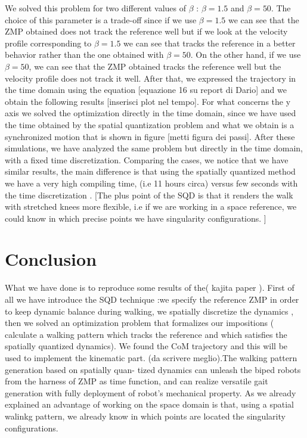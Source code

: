 \documentclass[a4paper]{article}
\begin{document}
We solved this problem for two different values of $\beta$ : $\beta=1.5$ and $\beta=50$. The choice of this parameter is a trade-off since if we use $\beta=1.5$ we can see that the ZMP obtained does not track the reference well but if we look at the velocity profile corresponding to $\beta=1.5$ we can see that tracks the reference in a better behavior rather than the one obtained with $\beta=50$. On the other hand, if we use $\beta=50$, we can see that the ZMP obtained tracks the reference well but the velocity profile does not track it well. 
After that, we expressed the trajectory in the time domain using the equation [equazione 16 su report di Dario] and we obtain the following results [inserisci plot nel tempo].
For what concerns the y axis we solved the optimization directly in the time domain, since we have used the time obtained by the spatial quantization problem and what we obtain is a synchronized motion that is shown in figure [metti figura dei passi].
After these simulations, we have analyzed the same problem but directly in the time domain, with a fixed time discretization. %
Comparing the cases, we notice that we have similar results, the main difference is that using the   spatially quantized method we have a very high compiling time, (i.e 11 hours circa) versus few seconds with the time discretization .
[The plus point of the SQD is that it renders the walk with stretched knees more flexible, i.e if we are working in a space reference, we could know in which precise points we have singularity configurations. ]%


\section{Conclusion}
What we have done is to reproduce some results of the( kajita paper ). First of all we have introduce the SQD technique :we specify the reference ZMP in order to keep dynamic balance during walking, we spatially discretize the dynamics , then we solved an optimization problem that formalizes our impositions ( calculate a walking pattern which tracks the reference and which satisfies the spatially quantized dynamics).
We found the CoM trajectory and this will be used to implement the kinematic part. (da scrivere meglio).The walking pattern generation based on spatially quan- tized dynamics can unleash the biped robots from the harness of ZMP as time function, and can realize versatile gait generation with fully deployment of robot’s mechanical property. As we already explained an advantage of working on the space domain is that, using a spatial walinkg pattern, we already know in which points are located the singularity configurations.
\end{document}
